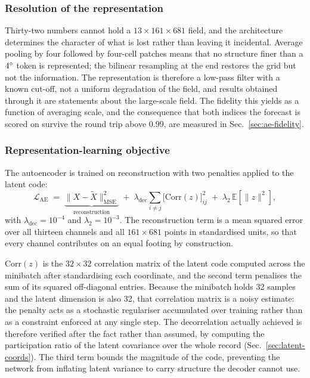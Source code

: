 \subsubsection{Resolution of the representation}
\label{sec:compression}

Thirty-two numbers cannot hold a $13\times161\times681$ field, and the architecture determines
the character of what is lost rather than leaving it incidental. Average pooling by four
followed by four-cell patches means that no structure finer than a $4^{\circ}$ token is
represented; the bilinear resampling at the end restores the grid but not the information. The
representation is therefore a low-pass filter with a known cut-off, not a uniform degradation
of the field, and results obtained through it are statements about the large-scale field. The
fidelity this yields as a function of averaging scale, and the consequence that both indices
the forecast is scored on survive the round trip above $0.99$, are measured in
Sec.~\ref{sec:ae-fidelity}.

\subsubsection{Representation-learning objective}
\label{sec:ae-loss}

The autoencoder is trained on reconstruction with two penalties applied to the latent code:
\[
\mathcal{L}_{\mathrm{AE}} \;=\;
\underbrace{\big\lVert X - \tilde{X}\big\rVert^2_{\mathrm{MSE}}}_{\text{reconstruction}}
\;+\; \lambda_{\mathrm{dec}} \sum_{i\neq j} \big[\mathrm{Corr}(z)\big]_{ij}^{2}
\;+\; \lambda_{2}\,\mathbb{E}\!\left[\lVert z\rVert^2\right],
\]
with $\lambda_{\mathrm{dec}}=10^{-4}$ and $\lambda_{2}=10^{-3}$. The reconstruction term is a
mean squared error over all thirteen channels and all $161\times681$ points in standardised
units, so that every channel contributes on an equal footing by construction.

$\mathrm{Corr}(z)$ is the $32\times32$ correlation matrix of the latent code computed across
the minibatch after standardising each coordinate, and the second term penalises the sum of its
squared off-diagonal entries. Because the minibatch holds 32 samples and the latent dimension
is also 32, that correlation matrix is a noisy estimate: the penalty acts as a stochastic
regulariser accumulated over training rather than as a constraint enforced at any single step.
The decorrelation actually achieved is therefore verified after the fact rather than assumed,
by computing the participation ratio of the latent covariance over the whole record
(Sec.~\ref{sec:latent-coords}). The third term bounds the magnitude of the code, preventing the
network from inflating latent variance to carry structure the decoder cannot use.

